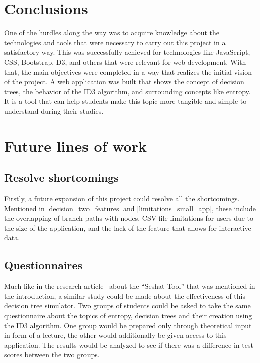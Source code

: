 
\section{Conclusions}
One of the hurdles along the way was to acquire knowledge about the technologies and tools that were necessary to carry out this project in a satisfactory way. This was successfully achieved for technologies like JavaScript, CSS, Bootstrap, D3, and others that were relevant for web development.
With that, the main objectives were completed in a way that realizes the initial vision of the project. A web application was built that shows the concept of decision trees, the behavior of the ID3 algorithm, and surrounding concepts like entropy.
It is a tool that can help students make this topic more tangible and simple to understand during their studies.

\section{Future lines of work}
\subsection{Resolve shortcomings}
Firstly, a future expansion of this project could resolve all the shortcomings. Mentioned in \ref{decision_two_features} and \ref{limitations_small_app}, these include the overlapping of branch paths with nodes, CSV file limitations for users due to the size of the application, and the lack of the feature that allows for interactive data. 

\subsection{Questionnaires}
Much like in the research article~\cite{https://doi.org/10.1002/cae.22036} about the ``Seshat Tool'' that was mentioned in the introduction, a similar study could be made about the effectiveness of this decision tree simulator. Two groups of students could be asked to take the same questionnaire about the topics of entropy, decision trees and their creation using the ID3 algorithm. One group would be prepared only through theoretical input in form of a lecture, the other would additionally be given access to this application. The results would be analyzed to see if there was a difference in test scores between the two groups.

